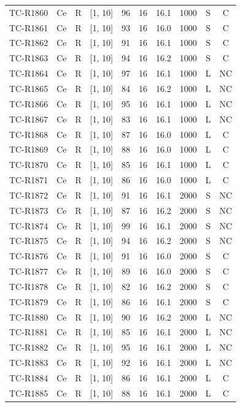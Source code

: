 \begin{longtable}{lccccccccc}
TC-R1860 & Ce & R & [1, 10] & 96 & 16 & 16.1 & 1000 & S & C \\
TC-R1861 & Ce & R & [1, 10] & 93 & 16 & 16.0 & 1000 & S & C \\
TC-R1862 & Ce & R & [1, 10] & 91 & 16 & 16.1 & 1000 & S & C \\
TC-R1863 & Ce & R & [1, 10] & 94 & 16 & 16.2 & 1000 & S & C \\
TC-R1864 & Ce & R & [1, 10] & 97 & 16 & 16.1 & 1000 & L & NC \\
TC-R1865 & Ce & R & [1, 10] & 84 & 16 & 16.2 & 1000 & L & NC \\
TC-R1866 & Ce & R & [1, 10] & 95 & 16 & 16.1 & 1000 & L & NC \\
TC-R1867 & Ce & R & [1, 10] & 83 & 16 & 16.1 & 1000 & L & NC \\
TC-R1868 & Ce & R & [1, 10] & 87 & 16 & 16.0 & 1000 & L & C \\
TC-R1869 & Ce & R & [1, 10] & 88 & 16 & 16.0 & 1000 & L & C \\
TC-R1870 & Ce & R & [1, 10] & 85 & 16 & 16.1 & 1000 & L & C \\
TC-R1871 & Ce & R & [1, 10] & 86 & 16 & 16.0 & 1000 & L & C \\
TC-R1872 & Ce & R & [1, 10] & 91 & 16 & 16.1 & 2000 & S & NC \\
TC-R1873 & Ce & R & [1, 10] & 87 & 16 & 16.2 & 2000 & S & NC \\
TC-R1874 & Ce & R & [1, 10] & 99 & 16 & 16.1 & 2000 & S & NC \\
TC-R1875 & Ce & R & [1, 10] & 94 & 16 & 16.2 & 2000 & S & NC \\
TC-R1876 & Ce & R & [1, 10] & 91 & 16 & 16.0 & 2000 & S & C \\
TC-R1877 & Ce & R & [1, 10] & 89 & 16 & 16.0 & 2000 & S & C \\
TC-R1878 & Ce & R & [1, 10] & 82 & 16 & 16.2 & 2000 & S & C \\
TC-R1879 & Ce & R & [1, 10] & 86 & 16 & 16.1 & 2000 & S & C \\
TC-R1880 & Ce & R & [1, 10] & 90 & 16 & 16.2 & 2000 & L & NC \\
TC-R1881 & Ce & R & [1, 10] & 85 & 16 & 16.1 & 2000 & L & NC \\
TC-R1882 & Ce & R & [1, 10] & 95 & 16 & 16.1 & 2000 & L & NC \\
TC-R1883 & Ce & R & [1, 10] & 92 & 16 & 16.1 & 2000 & L & NC \\
TC-R1884 & Ce & R & [1, 10] & 86 & 16 & 16.1 & 2000 & L & C \\
TC-R1885 & Ce & R & [1, 10] & 88 & 16 & 16.1 & 2000 & L & C \\

\end{longtable}
